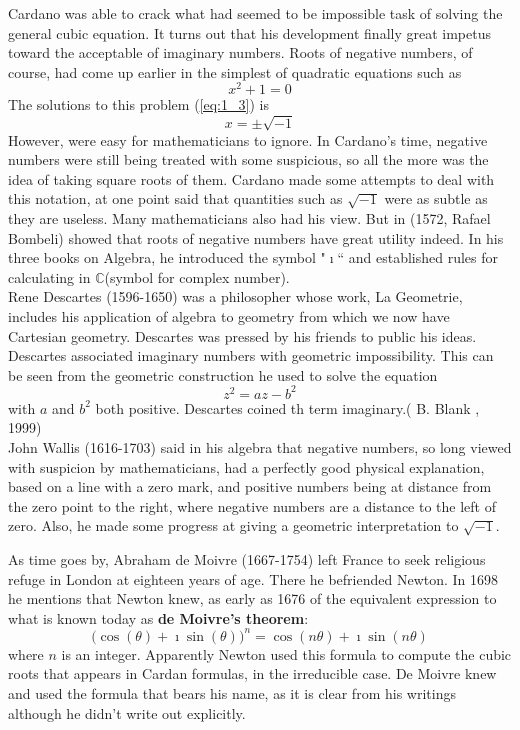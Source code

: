 \documentclass[11pt]{report}
\newcommand{\refn}[1]{(\ref{#1})}
\newcommand{\refx}[1]{\refn{eq:#1}}
\newcommand{\bt}[1]{\textbf{#1}}
\newcommand{\NI}{\noindent}
\newcommand{\imaginary}{\imath}
\newcommand{\complex}{\mathbb{C}}
\begin{document}
	\NI Cardano was able to crack what had seemed to be impossible task of solving the general cubic equation. It turns out that his development finally great impetus toward the acceptable of imaginary numbers. Roots of negative numbers, of course, had come up earlier in the simplest of quadratic equations such as 
	\begin{equation}
		x^2 + 1 = 0\label{eq:1_3}
	\end{equation}
	The solutions to this problem \refx{1_3} is
	\begin{equation}
		x= \pm\sqrt{-1}\label{eq:1_4}
	\end{equation}
	However, were easy for mathematicians to ignore. In Cardano's time, negative numbers were still being treated with some suspicious, so all the more was the idea of taking square roots of them. Cardano made some attempts to deal with this notation, at one point said that quantities such as $\sqrt{-1}$ were as subtle as they are useless. Many mathematicians also had his view. But in (1572, Rafael Bombeli) showed that roots of negative numbers have great utility indeed. In his three books on Algebra, he introduced the symbol "$\imaginary$`` and established rules for calculating in $\complex$(symbol for complex number).\\
	
	\NI Rene Descartes (1596-1650) was a philosopher whose work, La Geometrie, includes his application of algebra to geometry from which we now have Cartesian geometry. Descartes was pressed by his friends to public his ideas. Descartes associated imaginary numbers with geometric impossibility. This can be seen from the geometric construction he used to solve the equation
	\begin{equation}
		z^2 = az-b^2\label{eq:1_5}
	\end{equation}
	with $a$ and $b^2$ both positive. Descartes coined th term imaginary.( B. Blank , 1999)\\
	
	\NI John Wallis (1616-1703) said in his algebra that negative numbers, so long viewed with suspicion by mathematicians, had a perfectly good physical explanation, based on a line with a zero mark, and positive numbers being at distance from the zero point to the right, where negative numbers are a distance to the left of zero. Also, he made some progress at giving a geometric interpretation to $\sqrt{-1}$.
	
	\NI As time goes by, Abraham de Moivre (1667-1754) left France to seek religious refuge in London at eighteen years of age. There he befriended Newton. In 1698 he mentions that Newton knew, as early as 1676 of the equivalent expression to what is known today as \bt{de Moivre's theorem}:
	\begin{equation}
		\Big(\cos(\theta) + \imaginary\sin(\theta)\Big)^n = \cos(n\theta) + \imaginary\sin(n\theta)\label{eq:1_6}
	\end{equation}
	where $n$ is an integer. Apparently Newton used this formula to compute the cubic roots that appears in Cardan formulas, in the irreducible case. De Moivre knew and used the formula that bears his name, as it is clear from his writings although he didn't write out explicitly.\\
	
\end{document}
